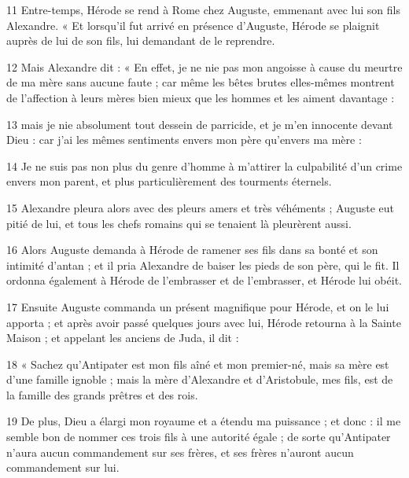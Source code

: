 \par 11 Entre-temps, Hérode se rend à Rome chez Auguste, emmenant avec lui son fils Alexandre. « Et lorsqu'il fut arrivé en présence d'Auguste, Hérode se plaignit auprès de lui de son fils, lui demandant de le reprendre.

\par 12 Mais Alexandre dit : « En effet, je ne nie pas mon angoisse à cause du meurtre de ma mère sans aucune faute ; car même les bêtes brutes elles-mêmes montrent de l'affection à leurs mères bien mieux que les hommes et les aiment davantage :

\par 13 mais je nie absolument tout dessein de parricide, et je m'en innocente devant Dieu : car j'ai les mêmes sentiments envers mon père qu'envers ma mère :

\par 14 Je ne suis pas non plus du genre d'homme à m'attirer la culpabilité d'un crime envers mon parent, et plus particulièrement des tourments éternels.

\par 15 Alexandre pleura alors avec des pleurs amers et très véhéments ; Auguste eut pitié de lui, et tous les chefs romains qui se tenaient là pleurèrent aussi.

\par 16 Alors Auguste demanda à Hérode de ramener ses fils dans sa bonté et son intimité d'antan ; et il pria Alexandre de baiser les pieds de son père, qui le fit. Il ordonna également à Hérode de l'embrasser et de l'embrasser, et Hérode lui obéit.

\par 17 Ensuite Auguste commanda un présent magnifique pour Hérode, et on le lui apporta ; et après avoir passé quelques jours avec lui, Hérode retourna à la Sainte Maison ; et appelant les anciens de Juda, il dit :

\par 18 « Sachez qu'Antipater est mon fils aîné et mon premier-né, mais sa mère est d'une famille ignoble ; mais la mère d'Alexandre et d'Aristobule, mes fils, est de la famille des grands prêtres et des rois.

\par 19 De plus, Dieu a élargi mon royaume et a étendu ma puissance ; et donc : il me semble bon de nommer ces trois fils à une autorité égale ; de sorte qu'Antipater n'aura aucun commandement sur ses frères, et ses frères n'auront aucun commandement sur lui.

